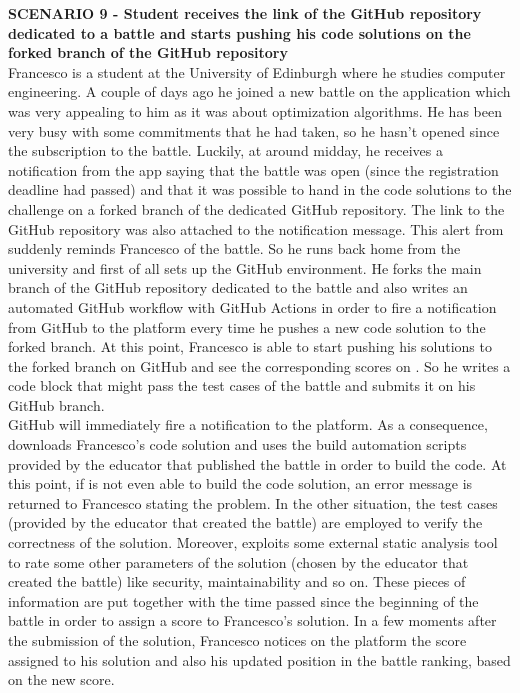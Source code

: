     \textbf{SCENARIO 9 - Student receives the link of the GitHub repository dedicated to a battle and starts pushing his code solutions on the forked branch of the GitHub repository}\\
    Francesco is a student at the University of Edinburgh where he studies computer engineering. A couple of days ago he joined a new battle on the \app application which was very appealing to him as it was about optimization algorithms. He has been very busy with some commitments that he had taken, so he hasn't opened \app since the subscription to the battle. Luckily, at around midday, he receives a notification from the app saying that the battle was open (since the registration deadline had passed) and that it was possible to hand in the code solutions to the challenge on a forked branch of the dedicated GitHub repository. The link to the GitHub repository was also attached to the notification message.
    This alert from \app suddenly reminds Francesco of the battle. So he runs back home from the university and first of all sets up the GitHub environment. He forks the main branch of the GitHub repository dedicated to the battle and also writes an automated GitHub workflow with GitHub Actions in order to fire a notification from GitHub to the \app platform every time he pushes a new code solution to the forked branch.
    At this point, Francesco is able to start pushing his solutions to the forked branch on GitHub and see the corresponding scores on \app. So he writes a code block that might pass the test cases of the battle and submits it on his GitHub branch.\\
    GitHub will immediately fire a notification to the \app platform. As a consequence, \app downloads Francesco's code solution and uses the build automation scripts provided by the educator that published the battle in order to build the code. At this point, if \app is not even able to build the code solution, an error message is returned to Francesco stating the problem. In the other situation, the test cases (provided by the educator that created the battle) are employed to verify the correctness of the solution. Moreover, \app exploits some external static analysis tool to rate some other parameters of the solution (chosen by the educator that created the battle) like security, maintainability and so on. These pieces of information are put together with the time passed since the beginning of the battle in order to assign a score to Francesco's solution.
    In a few moments after the submission of the solution, Francesco notices on the \app platform the score assigned to his solution and also his updated position in the battle ranking, based on the new score.\\
  
